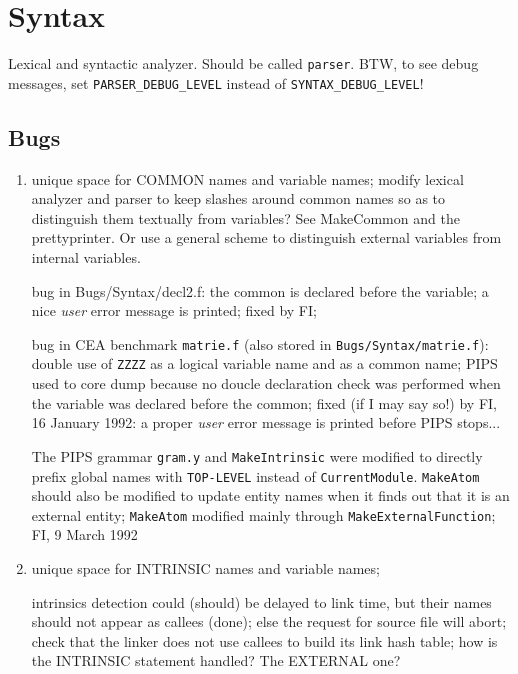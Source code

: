 \section{Syntax}

Lexical and syntactic analyzer. Should be called \verb+parser+. BTW, to
see debug messages, set \verb+PARSER_DEBUG_LEVEL+ instead of 
\verb+SYNTAX_DEBUG_LEVEL+!

\subsection{Bugs}

\begin{enumerate}

  \item \label{name-spaces}
	unique space for COMMON names and variable names; modify lexical
	analyzer and parser to keep slashes around common names so as to
	distinguish them textually from variables? See MakeCommon and the
	prettyprinter. Or use a general scheme to distinguish external
	variables from internal variables.

	bug in Bugs/Syntax/decl2.f: the common is declared before the variable;
	a nice {\em user} error message is printed; fixed by FI;

	bug in CEA benchmark \verb+matrie.f+
	(also stored in \verb+Bugs/Syntax/matrie.f+): 
	double use of \verb+ZZZZ+ as
	a logical variable name and as a common name; PIPS used to core dump
	because no doucle declaration check was performed when the
	variable was declared before the common; fixed (if I may say so!)
	by FI, 16 January 1992: a proper {\em user} error message 
	is printed before PIPS stops...

	The PIPS grammar \verb+gram.y+ and \verb+MakeIntrinsic+ were
	modified to directly prefix global names
	with \verb+TOP-LEVEL+ instead of \verb+CurrentModule+.
	\verb+MakeAtom+ should also be modified to update entity names
	when it finds out that it is an external entity; \verb+MakeAtom+
	modified mainly through \verb+MakeExternalFunction+; FI, 9 March 1992

  \item unique space for INTRINSIC names and variable names; 

	intrinsics 
	detection could (should) be delayed to link time, but their names
	should not appear as callees (done); else the request for source file
	will abort; check that the linker does not use callees to build
	its link hash table; how is the INTRINSIC statement handled? The
	EXTERNAL one?


\end{enumerate}
